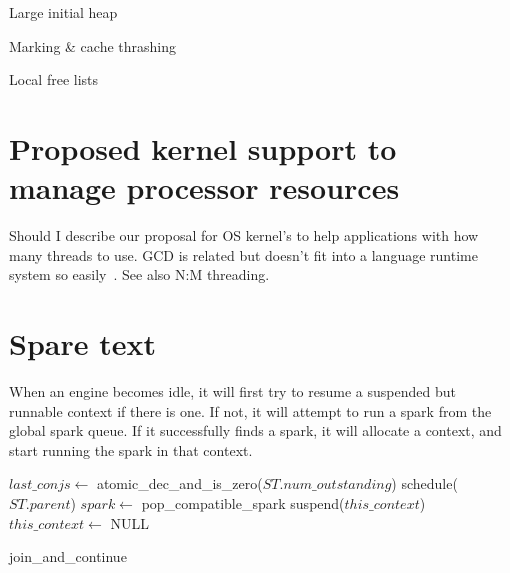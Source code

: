 Large initial heap

Marking \& cache thrashing

Local free lists

\section{Proposed kernel support to manage processor resources}

    
Should I describe our proposal for OS kernel's to help
applications with how many threads to use.
GCD is related but doesn't fit into a language runtime system so
easily~\cite{apple_gcd}.
See also N:M threading.

\section{Spare text}


When an engine becomes idle, it will first try
to resume a suspended but runnable context if there is one.
If not, it will attempt to run a spark from the global spark queue.
If it successfully finds a spark, it will allocate a context,
and start running the spark in that context.


\begin{algorithm}
\begin{algorithmic}
  \State $last\_conjs \gets$ atomic\_dec\_and\_is\_zero($ST.num\_outstanding$)
    \Else
      \State schedule($ST.parent$)
    \EndIf
  \Else
    \State $spark \gets$ pop\_compatible\_spark
    \Else
         \State suspend($this\_context$)
         \State $this\_context \gets$ NULL
      \EndIf
    \EndIf
  \EndIf
\EndProcedure
\end{algorithmic}
\caption{join\_and\_continue}
\label{alg:join_and_continue}
\end{algorithm}

